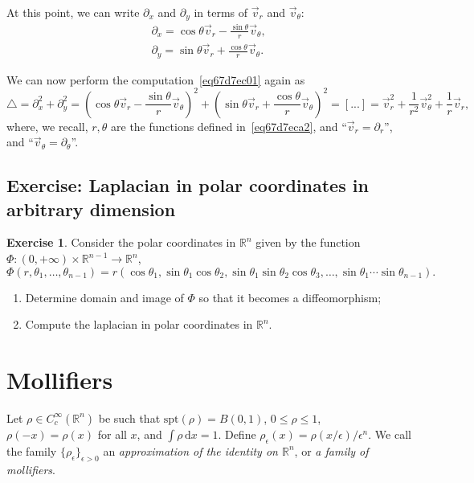 \documentclass[a4paper,9pt]{amsart}
\newcommand{\R}{\mathbb{R}}	%
\newcommand{\did}{\,\mathrm{d}}	%
\newcommand{\de}{\partial}		%
\newcommand{\spt}{\mathrm{spt}}
\newcommand{\laplacian}{\triangle}
\theoremstyle{plain}
\theoremstyle{definition}
\newtheorem{exercise}[proposition]{Exercise}%
\theoremstyle{remark}
\begin{document}
At this point, we can write $\de_x$ and $\de_y$ in terms of $\vec v_r$ and $\vec v_\theta$:
\begin{align*}
 	\de_x = \cos\theta \vec v_r - \frac{\sin\theta}{r} \vec v_\theta ,\\
	\de_y = \sin\theta \vec v_r + \frac{\cos\theta}{r} \vec v_\theta .
\end{align*}

We can now perform the computation~\eqref{eq67d7ec01} again as
\begin{equation}
	\laplacian
	= \de_x^2 + \de_y^2
	= (\cos\theta \vec v_r - \frac{\sin\theta}{r} \vec v_\theta)^2	
		+ (\sin\theta \vec v_r + \frac{\cos\theta}{r} \vec v_\theta)^2
	= [...]
	= \vec v_r^2 + \frac{1}{r^2} \vec v_\theta^2 + \frac1r \vec v_r ,
\end{equation}
where, we recall, $r,\theta$ are the functions defined in~\eqref{eq67d7eca2},
and ``$\vec v_r = \de_r$'', and ``$\vec v_\theta = \de_\theta$''.

\subsection{Exercise: Laplacian in polar coordinates in arbitrary dimension}
\begin{exercise}
	Consider the polar coordinates in $\R^n$ given by the function
	$\Phi:(0,+\infty)\times \R^{n-1}\to\R^n$,
	\begin{equation}
		\Phi(r,\theta_1,\dots,\theta_{n-1})
		= r ( \cos\theta_1, \sin\theta_1\cos\theta_2, \sin\theta_1\sin\theta_2\cos\theta_3, \dots, \sin\theta_1\cdots \sin\theta_{n-1} ) .
	\end{equation}
	\begin{enumerate}
	\item	Determine domain and image of $\Phi$ so that it becomes a diffeomorphism;
	\item	Compute the laplacian in polar coordinates in $\R^n$.
	\end{enumerate}
\end{exercise}

\section{Mollifiers}

Let $\rho\in C^\infty_c(\R^n)$ be such that $\spt(\rho)=B(0,1)$, $0\le \rho\le 1$, $\rho(-x)=\rho(x)$ for all $x$, and $\int\rho\did x = 1$.
Define $\rho_\epsilon(x) = \rho(x/\epsilon)/\epsilon^n$.
We call the family $\{\rho_\epsilon\}_{\epsilon>0}$ an \emph{approximation of the identity on $\R^n$}, or \emph{a family of mollifiers}.
\end{document}
